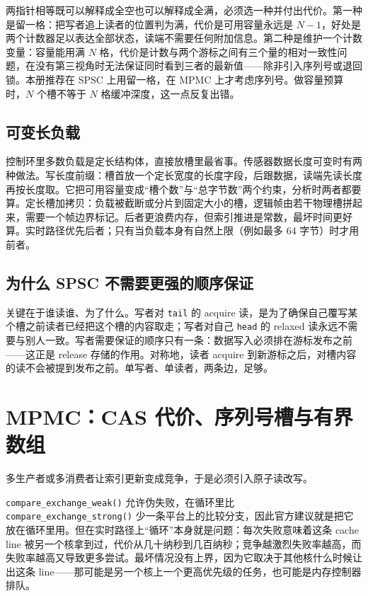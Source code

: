 \documentclass[12pt,a4paper,fontset=fandol]{ctexbook}
\newcommand{\Fn}[1]{\texttt{#1()}}
\newcommand{\Tp}[1]{\texttt{#1}}
\begin{document}
两指针相等既可以解释成全空也可以解释成全满，必须选一种并付出代价。第一种是留一格：把写者追上读者的位置判为满，代价是可用容量永远是 $N-1$，好处是两个计数器足以表达全部状态，读端不需要任何附加信息。第二种是维护一个计数变量：容量能用满 $N$ 格，代价是计数与两个游标之间有三个量的相对一致性问题，在没有第三视角时无法保证同时看到三者的最新值——除非引入序列号或退回锁。本册推荐在 SPSC 上用留一格，在 MPMC 上才考虑序列号。做容量预算时，$N$ 个槽不等于 $N$ 格缓冲深度，这一点反复出错。

\subsection*{可变长负载}

控制环里多数负载是定长结构体，直接放槽里最省事。传感器数据长度可变时有两种做法。写长度前缀：槽首放一个定长宽度的长度字段，后跟数据，读端先读长度再按长度取。它把可用容量变成“槽个数”与“总字节数”两个约束，分析时两者都要算。定长槽加拷贝：负载被截断或分片到固定大小的槽，逻辑帧由若干物理槽拼起来，需要一个帧边界标记。后者更浪费内存，但索引推进是常数，最坏时间更好算。实时路径优先后者；只有当负载本身有自然上限（例如最多 64 字节）时才用前者。

\subsection*{为什么 SPSC 不需要更强的顺序保证}

关键在于谁读谁、为了什么。写者对 \Tp{tail} 的 acquire 读，是为了确保自己覆写某个槽之前读者已经把这个槽的内容取走；写者对自己 \Tp{head} 的 relaxed 读永远不需要与别人一致。写者需要保证的顺序只有一条：数据写入必须排在游标发布之前——这正是 release 存储的作用。对称地，读者 acquire 到新游标之后，对槽内容的读不会被提到发布之前。单写者、单读者，两条边，足够。

\section{MPMC：CAS 代价、序列号槽与有界数组}

多生产者或多消费者让索引更新变成竞争，于是必须引入原子读改写。

\Fn{compare\_exchange\_weak} 允许伪失败，在循环里比 \Fn{compare\_exchange\_strong} 少一条平台上的比较分支，因此官方建议就是把它放在循环里用。但在实时路径上“循环”本身就是问题：每次失败意味着这条 cache line 被另一个核拿到过，代价从几十纳秒到几百纳秒；竞争越激烈失败率越高，而失败率越高又导致更多尝试。最坏情况没有上界，因为它取决于其他核什么时候让出这条 line——那可能是另一个核上一个更高优先级的任务，也可能是内存控制器排队。
\end{document}
